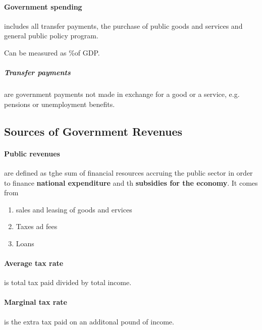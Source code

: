 \documentclass[a4paper,titlepage] {scrartcl}
\begin{document}
\paragraph{Government spending} %
\label{par:government_spending}
includes all transfer payments, the purchase of public goods and services and general public policy program.

Can be measured as $\%$of GDP.


\subparagraph{Transfer payments} %
\label{par:transfer_payments}
are government payments not made in exchange for a good or a service, e.g. pensions or unemployment benefits.



\subsection{Sources of Government Revenues} %
\label{sub:sources_of_government_revenues}
\paragraph{Public revenues} %
\label{par:public_revenues}
are defined as tghe sum of financial resources accruing the public sector in order to finance \textbf{national expenditure} and th \textbf{subsidies for the economy}. It comes from
\begin{enumerate}
	\item sales and leasing of goods and ervices
	\item Taxes ad fees
	\item Loans
\end{enumerate}


\paragraph{Average tax rate} %
\label{par:average_tax_rate}
is total tax paid divided by total income.	

\paragraph{Marginal tax rate} %
\label{par:marginal_tax_rate}
is the extra tax paid on an additonal pound of income.
\end{document}
